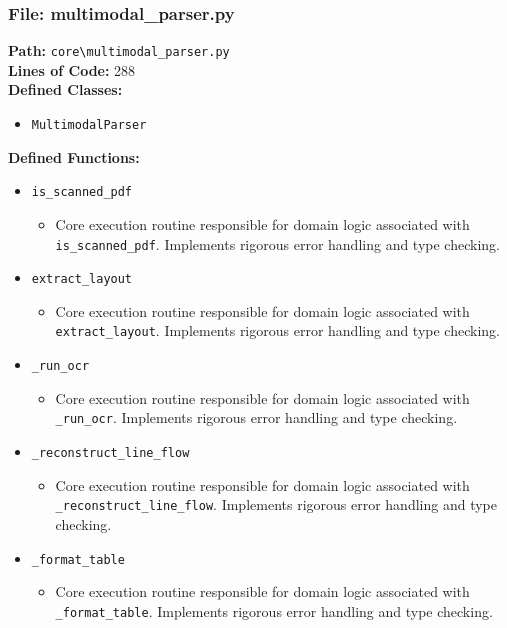 \documentclass[10pt,journal,compsoc]{IEEEtran}
\begin{document}
\subsubsection{File: multimodal\_parser.py}
\textbf{Path:} \texttt{core\textbackslash{}multimodal\_parser.py} \\
\textbf{Lines of Code:} 288 \\
\textbf{Defined Classes:}
\begin{itemize}
    \item \texttt{MultimodalParser}
\end{itemize}
\textbf{Defined Functions:}
\begin{itemize}
    \item \texttt{is\_scanned\_pdf}
    \begin{itemize} \item Core execution routine responsible for domain logic associated with \texttt{is\_scanned\_pdf}. Implements rigorous error handling and type checking. \end{itemize}
    \item \texttt{extract\_layout}
    \begin{itemize} \item Core execution routine responsible for domain logic associated with \texttt{extract\_layout}. Implements rigorous error handling and type checking. \end{itemize}
    \item \texttt{\_run\_ocr}
    \begin{itemize} \item Core execution routine responsible for domain logic associated with \texttt{\_run\_ocr}. Implements rigorous error handling and type checking. \end{itemize}
    \item \texttt{\_reconstruct\_line\_flow}
    \begin{itemize} \item Core execution routine responsible for domain logic associated with \texttt{\_reconstruct\_line\_flow}. Implements rigorous error handling and type checking. \end{itemize}
    \item \texttt{\_format\_table}
    \begin{itemize} \item Core execution routine responsible for domain logic associated with \texttt{\_format\_table}. Implements rigorous error handling and type checking. \end{itemize}

\end{itemize}
\end{document}
